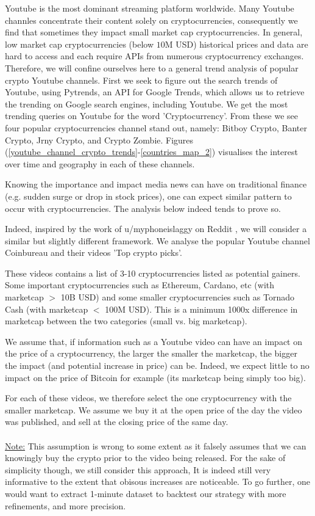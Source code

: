 \documentclass[twoside]{report}
\begin{document}
\begin{spacing}{1}
Youtube is the most dominant streaming platform worldwide. Many Youtube channles concentrate their content solely on cryptocurrencies, consequently we find that sometimes they impact small market cap cryptocurrencies. In general, low market cap cryptocurrencies (below $10
$M USD) historical prices and data are hard to access and each require APIs from numerous cryptocurrency exchanges. Therefore, we will confine ourselves here to a general trend analysis of popular crypto Youtube channels.
First we seek to figure out the search trends of Youtube, using Pytrends, an API for Google Trends, which allows us to retrieve the trending on Google search engines, including Youtube. We get the most trending queries on Youtube for the word 'Cryptocurrency'. From these we see four popular cryptocurrencies channel stand out, namely: Bitboy Crypto, Banter Crypto, Jrny Crypto, and Crypto Zombie. Figures (\ref{youtube_channel_crypto_trends}-\ref{countries_map_2}) visualises the interest over time and geography in each of these channels.

Knowing the importance and impact media news can have on traditional finance (e.g. sudden surge or drop in stock prices), one can expect similar pattern to occur with cryptocurrencies. The analysis below indeed tends to prove so.

Indeed, inspired by the work of u/myphoneislaggy on Reddit \cite{reddit_coinbureau_analysis}, we will consider a similar but slightly different framework. We analyse the popular Youtube channel Coinbureau and their videos 'Top crypto picks'.

These videos contains a list of 3-10 cryptocurrencies listed as potential gainers. Some important cryptocurrencies such as Ethereum, Cardano, etc (with marketcap $>$ 10B USD) and some smaller cryptocurrencies such as Tornado Cash (with marketcap $<$ 100M USD). This is a minimum 1000x difference in marketcap between the two categories (small vs. big marketcap). 

We assume that, if information such as a Youtube video can have an impact on the price of a cryptocurrency, the larger the smaller the marketcap, the bigger the impact (and potential increase in price) can be. Indeed, we expect little to no impact on the price of Bitcoin for example (its marketcap being simply too big).

For each of these videos, we therefore select the one cryptocurrency with the smaller marketcap. We assume we buy it at the open price of the day the video was published, and sell at the closing price of the same day.
\\ \\
\underline{Note:} This assumption is wrong to some extent as it falsely assumes that we can knowingly buy the crypto prior to the video being released. For the sake of simplicity though, we still consider this approach, It is indeed still very informative to the extent that obisous increases are noticeable. To go further, one would want to extract 1-minute dataset to backtest our strategy with more refinements, and more precision.



\end{spacing}
\end{document}
